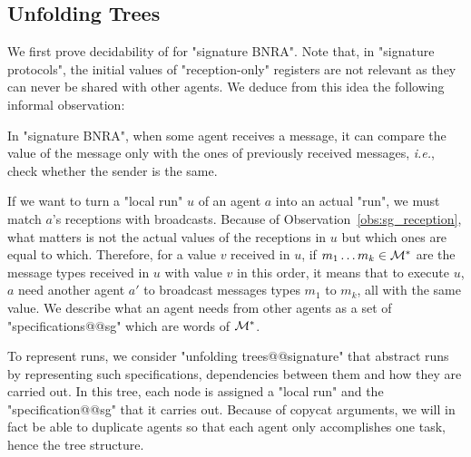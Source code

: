\subsection{Unfolding Trees}
\label{sec:unfolding_tree_signature}

We first prove decidability of \COVER for "signature BNRA". Note that, in "signature protocols", the initial values of "reception-only" registers are not relevant as they can never be shared with other agents. We deduce from this idea the following informal observation:
\begin{observation}
\label{obs:sg_reception} 
In "signature BNRA", when some agent receives a message, it can compare the value of the message only with the ones of previously received messages, \emph{i.e.}, check whether the sender is the same.
\end{observation}

If we want to turn a "local run" $u$ of an agent $a$ into an actual "run", we must match $a$'s receptions with broadcasts. Because of Observation~\ref{obs:sg_reception}, what matters is not the actual values of the receptions in $u$ but which ones are equal to which.  Therefore, for a value $v$ received in $u$, if $m_1 \dots m_k \in \mathcal{M}^*$ are the message types received in $u$ with value $v$ in this order, it means that to execute $u$, $a$ need another agent $a'$ to broadcast messages types $m_1$ to $m_k$, all with the same value.  
We describe what an agent needs from other agents as a set of "specifications@@sg" which are words of $\mathcal{M}^*$. 

To represent runs, we consider "unfolding trees@@signature" that abstract runs by representing such specifications, dependencies between them and how they are carried out. In this tree, each node is assigned a "local run" and the "specification@@sg" that it carries out. 
Because of copycat arguments, we will in fact be able to duplicate agents so that each agent only accomplishes one task, hence the tree structure.

